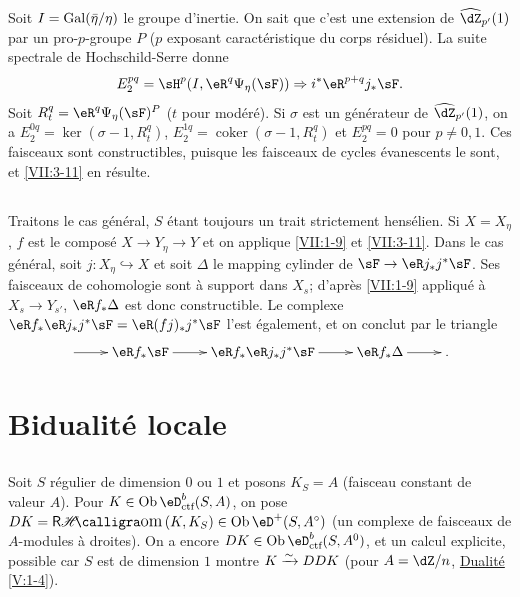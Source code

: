 Soit $I=\operatorname{Gal}(\bar\eta/\eta)$ le groupe d'inertie. On sait que c'est une 
extension de $\widehat\dZ_{p'}(1)$ par un pro-$p$-groupe $P$ ($p$ exposant 
caractéristique du corps résiduel). La suite spectrale de Hochschild-Serre 
donne 
\[
  E_2^{p q} = \sH^p(I,\eR^q\Psi_\eta(\sF))\Rightarrow i^\ast \eR^{p+q}j_\ast\sF \text{.} 
\]
Soit $R_t^q = \eR^q\Psi_\eta(\sF)^P$ ($t$ pour modéré). Si $\sigma$ est un 
générateur de $\widehat\dZ_{p'}(1)$, on a 
$E_2^{0 q} = \ker(\sigma-1,R_t^q)$, 
$E_2^{1 q} = \operatorname{coker}(\sigma-1,R_t^q)$ et $E_2^{p q} = 0$ pour 
$p\ne 0,1$. Ces faisceaux sont constructibles, puisque les faisceaux de cycles 
évanescents le sont, et \ref{VII:3-11} en résulte. 





\subsection{}\label{VII:3-12}

Traitons le cas général, $S$ étant toujours un trait strictement 
hensélien. Si $X=X_\eta$, $f$ est le composé $X\to Y_\eta \to Y$ et on 
applique \ref{VII:1-9} et \ref{VII:3-11}. Dans le cas général, soit 
$j:X_\eta\hookrightarrow X$ et soit $\Delta$ le mapping cylinder de 
$\sF \to \eR j_\ast j^\ast \sF$. Ses faisceaux de cohomologie sont à support 
dans $X_s$; d'après \ref{VII:1-9} appliqué à $X_s \to Y_{s'}$, 
$\eR f_\ast \Delta$ est donc constructible. Le complexe 
$\eR f_\ast \eR j_\ast j^\ast \sF = \eR(f j)_\ast j^\ast \sF$ l'est 
également, et on conclut par le triangle 
\[\xymatrix{
  \ar[r] 
    & \eR f_\ast \sF \ar[r] 
    & \eR f_\ast \eR j_\ast j^\ast \sF \ar[r] 
    & \eR f_\ast \Delta \ar[r] 
    & \text{.} 
}\]










\section{Bidualité locale}\label{VII:4}





\subsection{}\label{VII:4-1}

Soit $S$ régulier de dimension $0$ ou $1$ et posons $K_S=A$ (faisceau 
constant de valeur $A$). Pour $K\in\ob\eD_\text{ctf}^b(S,A)$, on pose 
$D K=\rHom(K,K_S)\in\ob\eD^+(S,A^\circ)$ (un complexe de faisceaux de 
$A$-modules à droites). On a encore $D K\in\ob\eD_\text{ctf}^b(S,A^0)$, et 
un calcul explicite, possible car $S$ est de dimension $1$ montre 
$K\xrightarrow\sim D D K$ (pour $A=\dZ/n$, \hyperref[V]{Dualité} \ref{V:1-4}). 





